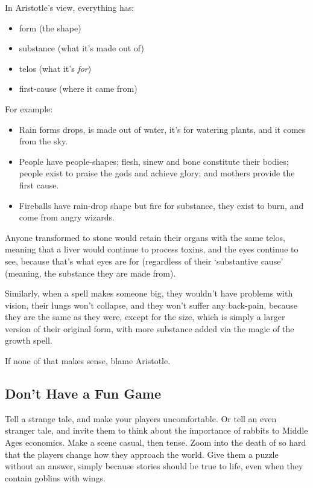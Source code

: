\begin{multicols}{2}
In Aristotle's view, everything has:

\begin{itemize}
  \item
  form (the shape)
  \item
  substance (what it's made out of)
  \item
  telos (what it's \emph{for})
  \item
  first-cause (where it came from)
\end{itemize}

\noindent
For example:

\begin{itemize}
  \item
  Rain forms drops, is made out of water, it's for watering plants, and it comes from the sky.
  \item
  People have people-shapes; flesh, sinew and bone constitute their bodies; people exist to praise the gods and achieve glory; and mothers provide the first cause.
  \item
  Fireballs have rain-drop shape but fire for substance, they exist to burn, and come from angry wizards.
\end{itemize}

Anyone transformed to stone would retain their organs with the same telos, meaning that a liver would continue to process toxins, and the eyes continue to see, because that's what eyes are for (regardless of their `substantive cause' (meaning, the substance they are made from).

Similarly, when a spell makes someone big, they wouldn't have problems with vision, their lungs won't collapse, and they won't suffer any back-pain, because they are the same as they were, except for the size, which is simply a larger version of their original form, with more substance added via the magic of the growth spell.

If none of that makes sense, blame Aristotle.

\subsection{Don't Have a Fun Game}

Tell a strange tale, and make your players uncomfortable.
Or tell an even stranger tale, and invite them to think about the importance of rabbits to Middle Ages economics.
Make a scene casual, then tense.
Zoom into the death of  so hard that the players change how they approach the world.
Give them a puzzle without an answer, simply because stories should be true to life, even when they contain goblins with wings.


\end{multicols}
